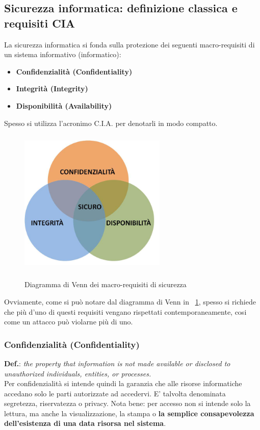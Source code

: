 \subsection{Sicurezza informatica: definizione classica e requisiti CIA}
La sicurezza informatica si fonda sulla protezione dei seguenti macro-requisiti di un sistema informativo (informatico):
\begin{itemize} 
  \item \textbf{Confidenzialità (Confidentiality)}
  \item \textbf{Integrità (Integrity)}
  \item \textbf{Disponibilità (Availability)}
\end{itemize}
Spesso si utilizza l'acronimo C.I.A. per denotarli in modo compatto.
\begin{figure}[htbp]
	\centering%
	\subfigure%
	{\includegraphics[height=7cm, width=7cm, keepaspectratio]{Immagini/introduzione/venn_security}}
	\caption{Diagramma di Venn dei macro-requisiti di sicurezza \label{fig:venn_security}} 	
\end{figure}
Ovviamente, come si può notare dal diagramma di Venn in \figurename~\ref{fig:venn_security}, spesso si richiede che più d'uno di questi requisiti vengano rispettati contemporaneamente, cosi come un attacco può violarne più di uno.

\subsubsection{Confidenzialità (Confidentiality)}
\textbf{Def.}: \textit{the property that information is not made available or disclosed to unauthorized individuals, entities, or processes.} \\

Per confidenzialità si intende quindi la garanzia che alle risorse informatiche accedano solo le parti autorizzate ad accedervi. E' talvolta denominata segretezza, riservatezza o privacy. Nota bene: per accesso non si intende solo la lettura, ma anche la visualizzazione, la stampa o \textbf{la semplice consapevolezza dell'esistenza di una data risorsa nel sistema}.

